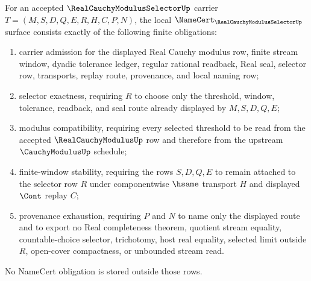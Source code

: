 \begin{theorem}
\label{thm:real-cauchy-modulus-selector-namecert-obligations}
For an accepted $\RealCauchyModulusSelectorUp$ carrier $T=(M,S,D,Q,E,R,H,C,P,N)$, the local $\NameCert_{\RealCauchyModulusSelectorUp}$ surface consists exactly of the following finite obligations:
\begin{enumerate}
\item carrier admission for the displayed Real Cauchy modulus row, finite stream window, dyadic tolerance ledger, regular rational readback, Real seal, selector row, transports, replay route, provenance, and local naming row;
\item selector exactness, requiring $R$ to choose only the threshold, window, tolerance, readback, and seal route already displayed by $M,S,D,Q,E$;
\item modulus compatibility, requiring every selected threshold to be read from the accepted $\RealCauchyModulusUp$ row and therefore from the upstream $\CauchyModulusUp$ schedule;
\item finite-window stability, requiring the rows $S,D,Q,E$ to remain attached to the selector row $R$ under componentwise $\hsame$ transport $H$ and displayed $\Cont$ replay $C$;
\item provenance exhaustion, requiring $P$ and $N$ to name only the displayed route and to export no Real completeness theorem, quotient stream equality, countable-choice selector, trichotomy, host real equality, selected limit outside $R$, open-cover compactness, or unbounded stream read.
\end{enumerate}
No NameCert obligation is stored outside those rows.
\end{theorem}
